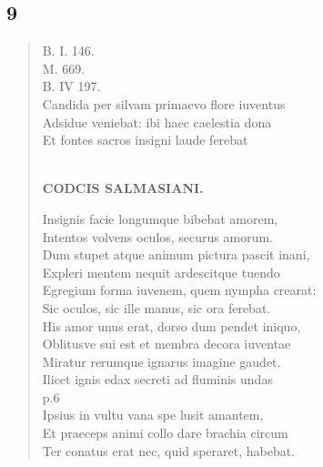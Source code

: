 \documentclass[11pt, a4paper]{report}
\begin{document}
            \subsection*{9}
      \begin{verse}
      B. I. 146. \\ M. 669. \\ B. IV 197. \\ Candida per silvam primaevo flore iuventus \\ Adsidue veniebat: ibi haec caelestia dona \\ Et fontes sacros insigni laude ferebat \\ 
        ﻿\pagebreak 
    \begin{center} \textbf{CODCIS SALMASIANI.} \end{center} \marginpar{[39]} Insignis facie longumque bibebat amorem, \\ Intentos volvens oculos, securus amorum. \\ Dum stupet atque animum pictura pascit inani, \\ Expleri mentem nequit ardescitque tuendo \\ Egregium forma iuvenem, quem nympha crearat: \\ Sic oculos, sic ille manus, sic ora ferebat. \\ His amor unus erat, dorso dum pendet iniquo, \\ Oblitusve sui est et membra decora iuventae \\ Miratur rerumque ignarus imagine gaudet. \\ Ilicet ignis edax secreti ad fluminis undas \\ p.6 \\ Ipsius in vultu vana spe lusit amantem, \\ Et praeceps animi collo dare brachia circum \\ Ter conatus erat nec, quid speraret, habebat. \\ 
      \end{verse}
  
\end{document}
